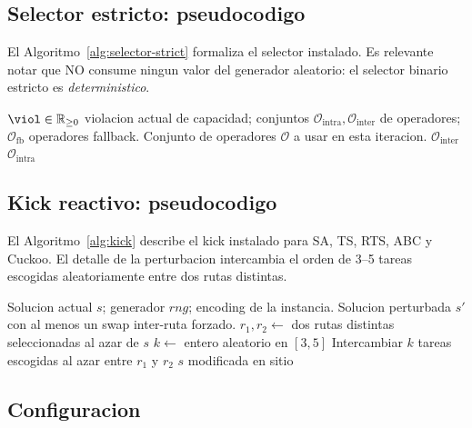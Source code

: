 \subsection{Selector estricto: pseudocodigo}

El Algoritmo~\ref{alg:selector-strict} formaliza el selector instalado.
Es relevante notar que NO consume ningun valor del generador
aleatorio: el selector binario estricto es \emph{deterministico}.

\begin{algorithm}[h]
\caption{Selector binario estricto.}
\label{alg:selector-strict}
\begin{algorithmic}[1]
\Require $\viol \in \mathbb{R}_{\ge 0}$ violacion actual de capacidad;
  conjuntos $\mathcal{O}_{\text{intra}}, \mathcal{O}_{\text{inter}}$ de operadores;
  $\mathcal{O}_{\text{fb}}$ operadores fallback.
\Ensure Conjunto de operadores $\mathcal{O}$ a usar en esta iteracion.
 
  \State \Return $\mathcal{O}_{\text{inter}}$
\Else
  \State \Return $\mathcal{O}_{\text{intra}}$
\EndIf
\end{algorithmic}
\end{algorithm}

\subsection{Kick reactivo: pseudocodigo}

El Algoritmo~\ref{alg:kick} describe el kick instalado para SA, TS,
RTS, ABC y Cuckoo. El detalle de la perturbacion intercambia el orden
de 3--5 tareas escogidas aleatoriamente entre dos rutas distintas.

\begin{algorithm}[h]
\caption{Kick reactivo poblacional.}
\label{alg:kick}
\begin{algorithmic}[1]
\Require Solucion actual $s$; generador $rng$; encoding de la instancia.
\Ensure Solucion perturbada $s'$ con al menos un swap inter-ruta forzado.
\State $r_1, r_2 \gets$ dos rutas distintas seleccionadas al azar de $s$
\State $k \gets$ entero aleatorio en $[3, 5]$
\State Intercambiar $k$ tareas escogidas al azar entre $r_1$ y $r_2$
\State \Return $s$ modificada en sitio
\end{algorithmic}
\end{algorithm}

\subsection{Configuracion}

